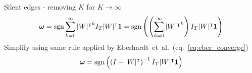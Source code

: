 \begin{frame}{Silent edges - removing $K$}
for $K\rightarrow\infty$
\begin{equation}
\boldsymbol{\omega} =
\operatorname{sgn} \sum_{k=0}^\infty {|W|^\intercal}^k
I_T |W|^\intercal \boldsymbol{1}
=
\operatorname{sgn} \left( \left( \sum_{k=0}^\infty {|W|^\intercal}^k \right)
I_T |W|^\intercal \boldsymbol{1} \right)
\end{equation}
Simplify using same rule applied by Eberhardt~et~al.~(eq.~\ref{eq:eber_converge})
\begin{equation}
\label{eq:detectable_no_K}
\boldsymbol{\omega} =
\operatorname{sgn} \left( \left( I - {|W|^\intercal} \right)^{-1}
I_T |W|^\intercal \boldsymbol{1} \right)
\end{equation}
\end{frame}